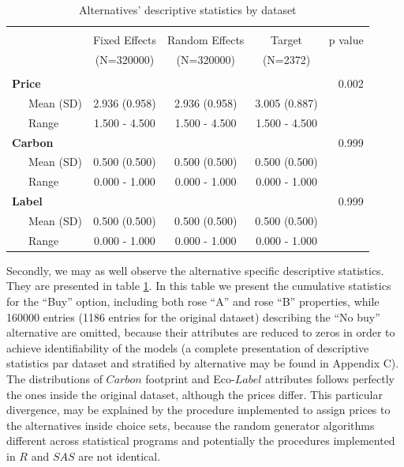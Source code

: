\documentclass[12pt,]{article}
\begin{document}
\begin{table}[!htbp] \centering 
  \caption{Alternatives' descriptive statistics by dataset} 
  \label{tab:alt1} 
\begin{tabular}{@{\extracolsep{5pt}}lcccr}
\\[-1.8ex]\hline 
\hline \\[-1.8ex] 
 & Fixed Effects  & Random Effects  & Target  & p value\\
 & (N=320000) & (N=320000) & (N=2372) &  \\
\hline \\[-1.8ex] 
\textbf{Price} &  &  &  & 0.002\\
~~~Mean (SD) & 2.936 (0.958) & 2.936 (0.958) & 3.005 (0.887) & \\
~~~Range & 1.500 - 4.500 & 1.500 - 4.500 & 1.500 - 4.500 & \\
\textbf{Carbon} &  &  &  & 0.999\\
~~~Mean (SD) & 0.500 (0.500) & 0.500 (0.500) & 0.500 (0.500) & \\
~~~Range & 0.000 - 1.000 & 0.000 - 1.000 & 0.000 - 1.000 & \\
\textbf{Label} &  &  &  & 0.999\\
~~~Mean (SD) & 0.500 (0.500) & 0.500 (0.500) & 0.500 (0.500) & \\
~~~Range & 0.000 - 1.000 & 0.000 - 1.000 & 0.000 - 1.000 & \\
\hline
\end{tabular}
\end{table}

Secondly, we may as well observe the alternative specific descriptive
statistics. They are presented in table \ref{tab:alt1}. In this table we
present the cumulative statistics for the ``Buy'' option, including both
rose ``A'' and rose ``B'' properties, while 160000 entries (1186 entries
for the original dataset) describing the ``No buy'' alternative are
omitted, because their attributes are reduced to zeros in order to
achieve identifiability of the models (a complete presentation of
descriptive statistics par dataset and stratified by alternative may be
found in Appendix C). The distributions of \(Carbon\) footprint and
Eco-\(Label\) attributes follows perfectly the ones inside the original
dataset, although the prices differ. This particular divergence, may be
explained by the procedure implemented to assign prices to the
alternatives inside choice sets, because the random generator algorithms
different across statistical programs and potentially the procedures
implemented in \(R\) and \(SAS\) are not identical.
\end{document}
